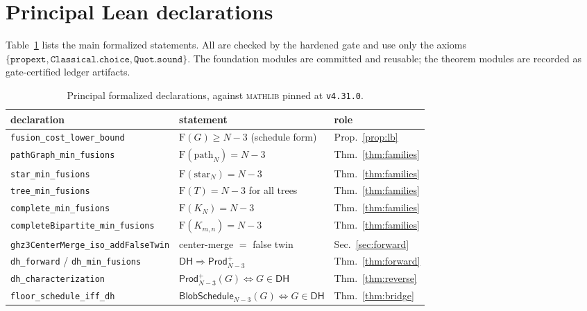 \documentclass[11pt]{article}
\theoremstyle{definition}
\theoremstyle{remark}
\newcommand{\F}{\mathrm{F}}
\newcommand{\Prod}{\mathsf{Prod}}
\newcommand{\N}{N}
\newcommand{\code}[1]{\texttt{#1}}
\begin{document}
\appendix
\section{Principal Lean declarations}

Table~\ref{tab:lean} lists the main formalized statements. All are checked by the hardened gate and
use only the axioms $\{\code{propext},\code{Classical.choice},\code{Quot.sound}\}$. The foundation
modules are committed and reusable; the theorem modules are recorded as gate-certified ledger
artifacts.

\begin{table}[h]
\centering
\small
\begin{tabular}{lll}
\toprule
declaration & statement & role\\
\midrule
\code{fusion\_cost\_lower\_bound} & $\F(G)\ge \N-3$ (schedule form) & Prop.~\ref{prop:lb}\\
\code{pathGraph\_min\_fusions}    & $\F(\text{path}_\N)=\N-3$        & Thm.~\ref{thm:families}\\
\code{star\_min\_fusions}         & $\F(\text{star}_\N)=\N-3$        & Thm.~\ref{thm:families}\\
\code{tree\_min\_fusions}         & $\F(T)=\N-3$ for all trees       & Thm.~\ref{thm:families}\\
\code{complete\_min\_fusions}     & $\F(K_\N)=\N-3$                  & Thm.~\ref{thm:families}\\
\code{completeBipartite\_min\_fusions} & $\F(K_{m,n})=\N-3$          & Thm.~\ref{thm:families}\\
\code{ghz3CenterMerge\_iso\_addFalseTwin} & center-merge $=$ false twin & Sec.~\ref{sec:forward}\\
\code{dh\_forward} / \code{dh\_min\_fusions} & $\mathsf{DH}\Rightarrow \Prod^{+}_{\N-3}$ & Thm.~\ref{thm:forward}\\
\code{dh\_characterization}       & $\Prod^{+}_{\N-3}(G)\Leftrightarrow G\in\mathsf{DH}$ & Thm.~\ref{thm:reverse}\\
\code{floor\_schedule\_iff\_dh}   & $\mathsf{BlobSchedule}_{\N-3}(G)\Leftrightarrow G\in\mathsf{DH}$ & Thm.~\ref{thm:bridge}\\
\bottomrule
\end{tabular}
\caption{Principal formalized declarations, against \textsc{mathlib} pinned at \code{v4.31.0}.}
\label{tab:lean}
\end{table}
\end{document}
